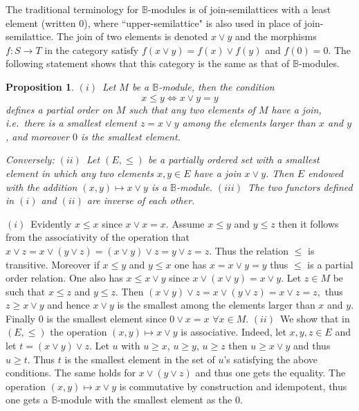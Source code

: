\documentclass[12pt]{article}
\newtheorem{prop}[thm]{Proposition}
\def\B{{\mathbb B}}
\newcommand{\ie}{{\it i.e.\/}\ }
\begin{document}
The traditional terminology for $\B$-modules is of join-semilattices with a least element (written $0$), where ``upper-semilattice" is also used in place of join-semilattice. The join of two elements is denoted $x\vee y$ and the morphisms $f:S\to T$ in the category satisfy $f(x\vee y)=f(x)\vee f(y)$ and $f(0)=0$. The following statement shows that this category is the same as that of $\B$-modules.
\begin{prop}\label{Bmod1}$(i)$~Let $M$ be a $\B$-module, then the condition
\begin{equation}\label{Bmod2}
	x\leq y\iff x\vee y =y
\end{equation}
defines a partial order on $M$ such that any two elements of $M$ have a join, \ie there is a smallest element $z=x\vee y$ among the elements larger than $x$ and $y$, and moreover $0$ is the smallest element.\vspace{.005in}

Conversely:\newline
	$(ii)$~Let $(E,\leq)$ be a partially ordered set with a smallest element in which any two elements $x,y\in E$ have a join $x\vee y$. Then $E$ endowed with the addition $(x,y)\mapsto x\vee y$ is a $\B$-module.
	\newline
	$(iii)$~The two functors defined in $(i)$ and $(ii)$ are inverse of each other.
\end{prop}
 \proof $(i)$~Evidently $x\leq x$ since $x\vee x=x$. Assume $x\leq y$ and $y\leq z$ then it follows from the associativity of the operation that
 $
 x\vee z= x\vee (y\vee z)=(x\vee y)\vee z=y\vee z=z.
 $
 Thus the relation $\leq$ is transitive. Moreover if $x\leq y$ and $y \leq x$ one has $x=x \vee y =y$ thus $\leq$ is a partial order relation. One also has $x\leq x\vee y$ since $x\vee (x\vee y)=x\vee y$. Let $z\in M$ be such that $x\leq z$ and $y\leq z$. Then 
 $
 (x\vee y)\vee z=x\vee (y\vee z)=x\vee z=z,
 $
 thus $z\geq x\vee y$ and hence $x\vee y$ is the smallest among the elements larger than $x$ and $y$. Finally $0$ is the smallest element since $0\vee x=x$ $\forall x\in M$.\newline
 $(ii)$~We show that in $(E,\le)$ the operation $(x,y)\mapsto x\vee y$ is associative. Indeed, let $x,y,z\in E$ and let $t=(x\vee y)\vee z$. Let $u$ with $u\geq x$, $u\geq y$, $u\geq z$ then $u\geq x\vee y$ and thus $u\geq t$. Thus $t$ is the smallest element in the set of $u$'s satisfying the above conditions. The same holds for $x\vee (y\vee z)$ and thus one gets the equality. The operation $(x,y)\mapsto x\vee y$ is commutative by construction and idempotent, thus one gets a $\B$-module with the smallest element as the $0$. \newline
\end{document}
